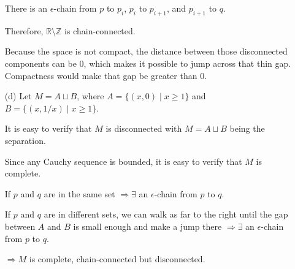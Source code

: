\begin{solution}
\begin{itemize}
              There is an $\epsilon$-chain from $p$ to $p_i$, $p_i$ to $p_{i+1}$, and $p_{i+1}$ to $q$.

              Therefore, $\mathbb{R} \setminus \mathbb{Z}$ is chain-connected.
              \begin{remark}{}
                  Because the space is not compact, the distance between those disconnected components can be $0$, which
                  makes it possible to jump across that thin gap. Compactness would make that gap be greater
                  than $0$.
              \end{remark}
        \item[(d)]
              Let $M = A \sqcup B$, where $A = \{(x, 0) \mid x \ge 1\}$ and $B = \{(x, 1/x) \mid x \ge 1\}$.

              It is easy to verify that $M$ is disconnected with $M = A \sqcup B$ being the separation.

              Since any Cauchy sequence is bounded, it is easy to verify that $M$ is complete.

              If $p$ and $q$ are in the same set $\Rightarrow \exists$ an $\epsilon$-chain from $p$ to $q$. 
              
              If $p$ and $q$ are in different sets, we can walk as far to the right until the gap between
              $A$ and $B$ is small enough and make a jump there $\Rightarrow \exists$ an $\epsilon$-chain from $p$ to $q$.

              $\Rightarrow M$ is complete, chain-connected but disconnected.

    \end{itemize}

\end{solution}